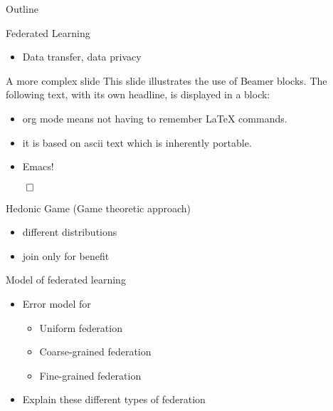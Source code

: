 \documentclass[presentation]{beamer}
\author{Lokesh Mohanty}
\date{\today}
\title{}
\begin{document}
\begin{frame}{Outline}
\tableofcontents
\end{frame}


\begin{frame}[label={sec:org8a6d250}]{Federated Learning}
\begin{itemize}
\item Data transfer, data privacy
\end{itemize}
\begin{block}{A more complex slide}
This slide illustrates the use of Beamer blocks.  The following text,
with its own headline, is displayed in a block:
\begin{theorem}\label{sec:org8ac8df5}
\begin{itemize}
\item org mode means not having to remember \LaTeX{} commands.
\item it is based on ascii text which is inherently portable.
\item Emacs!
\end{itemize}

\hfill \(\qed\)
\end{theorem}
\end{block}
\end{frame}

\begin{frame}[label={sec:orgb07f38b}]{Hedonic Game (Game theoretic approach)}
\begin{itemize}
\item different distributions
\item join only for benefit
\end{itemize}
\end{frame}
\begin{frame}[label={sec:org117f25a}]{Model of federated learning}
\begin{itemize}
\item Error model for
\begin{itemize}
\item Uniform federation
\item Coarse-grained federation
\item Fine-grained federation
\end{itemize}
\end{itemize}

\begin{NOTES}
\begin{itemize}
\item Explain these different types of federation
\end{itemize}
\end{NOTES}
\end{frame}
\end{document}
